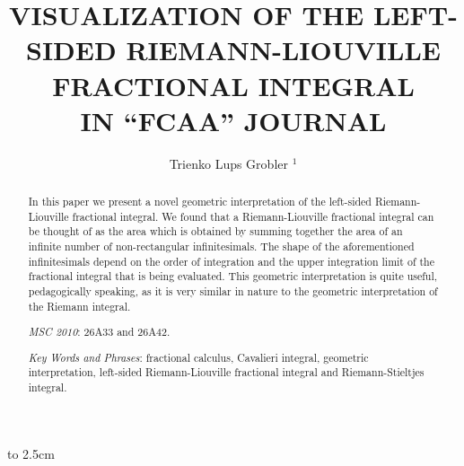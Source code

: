 \documentclass[twoside,reqno,11pt]{fcaa-var} %
\title[VISUALIZATION OF FRACTIONAL INTEGRALS]{VISUALIZATION OF THE LEFT-SIDED RIEMANN-LIOUVILLE FRACTIONAL INTEGRAL \\ [3pt] IN ``FCAA'' JOURNAL}
\author[\normalsize T.L Grobler]{\normalsize Trienko Lups Grobler $^1$}
\begin{document}
 \vbox to 2.5cm { \vfill }


 \bigskip \medskip

 \begin{abstract}In this paper we present a novel geometric interpretation of the left-sided Riemann-Liouville fractional integral. We found that a Riemann-Liouville fractional integral can be thought of as the area which is obtained by summing together the area of an infinite number of non-rectangular infinitesimals. The shape of the aforementioned infinitesimals depend on the order of integration and the upper integration limit of the fractional integral that is being evaluated. This geometric interpretation is quite useful, pedagogically speaking, as it is very similar in nature to the geometric interpretation of the Riemann integral. 

 \medskip

{\it MSC 2010\/}: 26A33 and 26A42.%

 \smallskip

{\it Key Words and Phrases}: fractional calculus, Cavalieri integral, geometric interpretation, left-sided Riemann-Liouville fractional integral and Riemann-Stieltjes integral.


\end{abstract}

 \maketitle

 \vspace*{-16pt}

\end{document}

